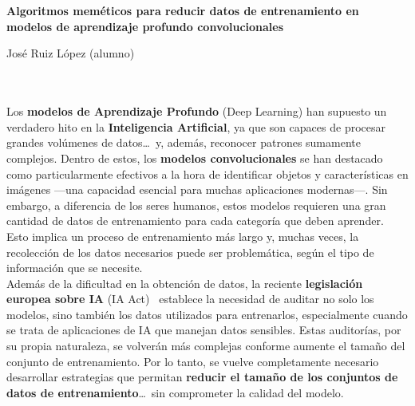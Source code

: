 
\chapter*{}



\cleardoublepage
\thispagestyle{empty}

\begin{center}
       {\large\bfseries Algoritmos meméticos para reducir datos de entrenamiento en modelos de aprendizaje profundo
              convolucionales}\\
\end{center}
\begin{center}
       José Ruiz López (alumno)\\
\end{center}

\\

\vspace{0.7cm}
\\

Los \textbf{modelos de Aprendizaje Profundo} (Deep Learning) han supuesto un verdadero hito en la
\textbf{Inteligencia Artificial}, ya que son capaces de procesar grandes volúmenes de datos\ldots\ y, además, reconocer
patrones sumamente complejos.
Dentro de estos, los \textbf{modelos convolucionales} se han destacado como particularmente efectivos a la hora de
identificar objetos y características en imágenes —una capacidad esencial para muchas aplicaciones modernas—.
Sin embargo, a diferencia de los seres humanos, estos modelos requieren una gran cantidad de datos de
entrenamiento para cada categoría que deben aprender.
Esto implica un proceso de entrenamiento más largo y, muchas veces, la recolección de los datos necesarios puede ser
problemática, según el tipo de información que se necesite. \\[6pt]

Además de la dificultad en la obtención de datos, la reciente \textbf{legislación europea sobre IA}
(IA Act)~\cite{ReglamentoIA2024} establece la necesidad de auditar no solo los modelos, sino también los datos
utilizados para entrenarlos, especialmente cuando se trata de aplicaciones de IA que manejan datos sensibles.
Estas auditorías, por su propia naturaleza, se volverán más complejas conforme aumente el tamaño del conjunto de
entrenamiento.
Por lo tanto, se vuelve completamente necesario desarrollar estrategias que permitan
\textbf{reducir el tamaño de los conjuntos de datos de entrenamiento}\ldots\ sin comprometer la calidad del modelo.
\\[6pt]

